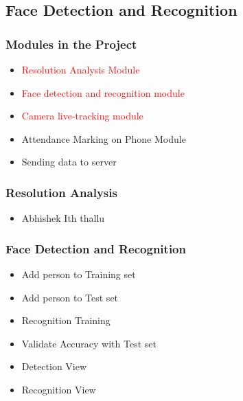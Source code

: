 \documentclass[10pt]{beamer}
\begin{document}
\subsection{Face Detection and Recognition}
\begin{frame}
\frametitle{Modules in the Project}
\begin{itemize}
\item{\textcolor{red}{Resolution Analysis Module}} \\
\item{\textcolor{red}{Face detection and recognition module}}\\
\item{\textcolor{red}{Camera live-tracking module}} \\
\item{Attendance Marking on Phone Module}\\
\item{Sending data to server}\\
\end{itemize}
\end{frame}
\begin{frame}
\frametitle{Resolution Analysis}
\begin{itemize}
\item{Abhishek Ith thallu}
\end{itemize}
\end{frame}
%
\begin{frame}
\frametitle{Face Detection and Recognition}
\begin{itemize}
        \item {Add person to Training set}
        \item {Add person to Test set}
        \item {Recognition Training}
        \item {Validate Accuracy with Test set}
        \item {Detection View}
        \item {Recognition View}
\end{itemize}
\end{frame}

\end{document}
